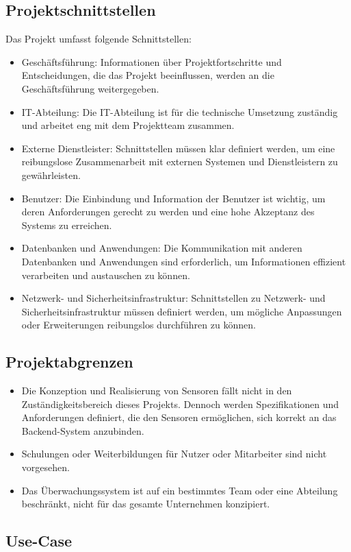 \begin{flushleft}
	\subsection{Projektschnittstellen}
	Das Projekt umfasst folgende Schnittstellen:
	\begin{itemize}
	\item Geschäftsführung: Informationen über Projektfortschritte und Entscheidungen, die das Projekt beeinflussen, werden an die Geschäftsführung weitergegeben.
	\item IT-Abteilung: Die IT-Abteilung ist für die technische Umsetzung zuständig und arbeitet eng mit dem Projektteam zusammen.
	\item Externe Dienstleister: Schnittstellen müssen klar definiert werden, um eine reibungslose Zusammenarbeit mit externen Systemen und Dienstleistern zu gewährleisten.
	\item Benutzer: Die Einbindung und Information der Benutzer ist wichtig, um deren Anforderungen gerecht zu werden und eine hohe Akzeptanz des Systems zu erreichen.
	\item Datenbanken und Anwendungen: Die Kommunikation mit anderen Datenbanken und Anwendungen sind erforderlich, um Informationen effizient verarbeiten und austauschen zu können.
	\item Netzwerk- und Sicherheitsinfrastruktur: Schnittstellen zu Netzwerk- und Sicherheitsinfrastruktur müssen definiert werden, um mögliche Anpassungen oder Erweiterungen reibungslos durchführen zu können.
	\end{itemize}


	\subsection{Projektabgrenzen}
	\begin{itemize}
		\item Die Konzeption und Realisierung von Sensoren fällt nicht in den Zuständigkeitsbereich dieses Projekts. Dennoch werden Spezifikationen und Anforderungen definiert, die den Sensoren ermöglichen, sich korrekt an das Backend-System anzubinden.
		\item Schulungen oder Weiterbildungen für Nutzer oder Mitarbeiter sind nicht vorgesehen.
		\item Das Überwachungssystem ist auf ein bestimmtes Team oder eine Abteilung beschränkt, nicht für das gesamte Unternehmen konzipiert.
	\end{itemize}


\subsection{Use-Case}

\end{flushleft}
